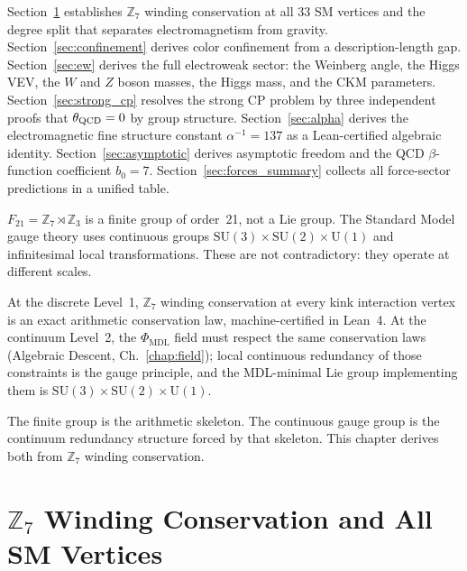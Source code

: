 \documentclass[11pt,openany]{book}
\theoremstyle{remark}
\newcommand{\PHIMDL}{\Phi_{\mathrm{MDL}}}
\newcommand{\ZS}{\mathbb{Z}_7}
\begin{document}
Section~\ref{sec:z7_vertices} establishes $\ZS$ winding conservation at all 33 SM vertices
and the degree split that separates electromagnetism from gravity.
Section~\ref{sec:confinement} derives color confinement from a description-length gap.
Section~\ref{sec:ew} derives the full electroweak sector: the Weinberg angle, the Higgs
VEV, the $W$ and $Z$ boson masses, the Higgs mass, and the CKM parameters.
Section~\ref{sec:strong_cp} resolves the strong CP problem by three independent proofs
that $\theta_{\rm QCD} = 0$ by group structure.
Section~\ref{sec:alpha} derives the electromagnetic fine structure constant $\alpha^{-1}
= 137$ as a Lean-certified algebraic identity.
Section~\ref{sec:asymptotic} derives asymptotic freedom and the QCD $\beta$-function
coefficient $b_0 = 7$.
Section~\ref{sec:forces_summary} collects all force-sector predictions in a unified table.

\begin{tcolorbox}[colback=orange!4,colframe=orange!55!black,
  title={\textbf{How a Finite Group Produces Continuous Gauge Symmetry}},
  fonttitle=\small\bfseries, left=6pt, right=6pt, top=4pt, bottom=4pt]
\small
$F_{21} = \mathbb{Z}_7\rtimes\mathbb{Z}_3$ is a finite group of order~21, not a
Lie group.
The Standard Model gauge theory uses continuous groups
$\mathrm{SU}(3)\times\mathrm{SU}(2)\times\mathrm{U}(1)$ and infinitesimal local
transformations.
These are not contradictory: they operate at different scales.

At the discrete Level~1, $\mathbb{Z}_7$ winding conservation at every kink interaction
vertex is an exact arithmetic conservation law, machine-certified in Lean~4.
At the continuum Level~2, the $\PHIMDL$ field must respect the same conservation laws
(Algebraic Descent, Ch.~\ref{chap:field}); local continuous redundancy of those constraints
is the gauge principle, and the MDL-minimal Lie group implementing them is
$\mathrm{SU}(3)\times\mathrm{SU}(2)\times\mathrm{U}(1)$.

\smallskip\noindent
The finite group is the arithmetic skeleton.
The continuous gauge group is the continuum redundancy structure forced by that skeleton.
This chapter derives both from $\mathbb{Z}_7$ winding conservation.
\end{tcolorbox}

\medskip

\section{$\mathbb{Z}_7$ Winding Conservation and All SM Vertices}
\label{sec:z7_vertices}
\end{document}
